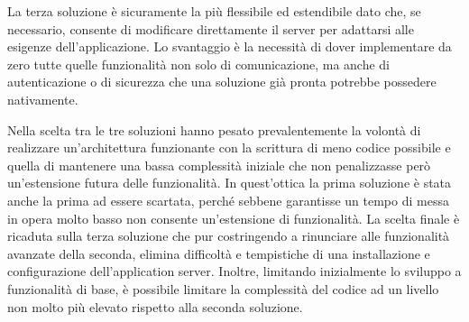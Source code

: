 La terza soluzione è sicuramente la più flessibile ed estendibile dato che, se necessario, consente di modificare direttamente il server per adattarsi alle esigenze dell'applicazione. Lo svantaggio è la necessità di dover implementare da zero tutte quelle funzionalità non solo di comunicazione, ma anche di autenticazione o di sicurezza che una soluzione già pronta potrebbe possedere nativamente.

Nella scelta tra le tre soluzioni hanno pesato prevalentemente la volontà di realizzare un'architettura funzionante con la scrittura di meno codice possibile e quella di mantenere una bassa complessità iniziale che non penalizzasse però un'estensione futura delle funzionalità. In quest'ottica la prima soluzione è stata anche la prima ad essere scartata, perché sebbene garantisse un tempo di messa in opera molto basso non consente un'estensione di funzionalità. 
La scelta finale è ricaduta sulla terza soluzione che pur costringendo a rinunciare alle funzionalità avanzate della seconda, elimina difficoltà e tempistiche di una installazione e configurazione dell'application server. Inoltre, limitando inizialmente lo sviluppo a funzionalità di base, è possibile limitare la complessità del codice ad un livello non molto più elevato rispetto alla seconda soluzione.
